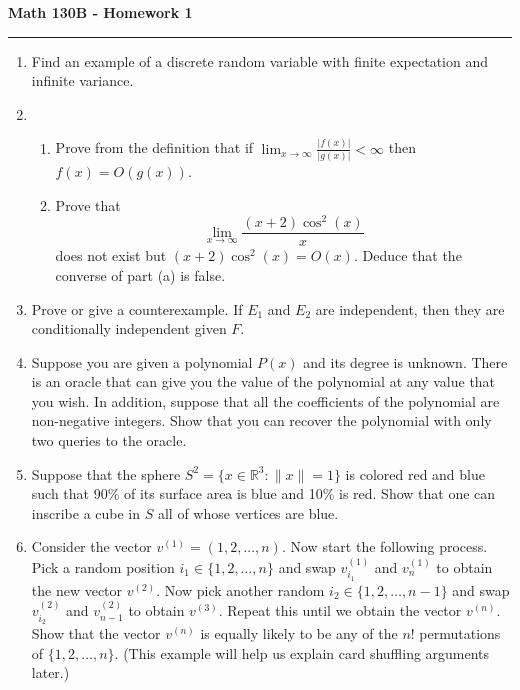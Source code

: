 \documentclass[11pt,letterpaper]{report}
\newcommand{\reals}{\mathbb{R}}
\begin{document}
\begin{center}
{\bf \Large Math 130B - Homework 1}
\vspace{0.2cm}
\hrule
\end{center}

\begin{enumerate}



	\item Find an example of a discrete random variable with finite expectation and infinite variance.

	\item \begin{enumerate}
		\item Prove from the definition that if $\lim_{x\to \infty}\frac{|f(x)|}{|g(x)|}<\infty$ then $f(x) = O(g(x))$.
		\item Prove that
		\[
		\lim_{x\to \infty} \frac{(x+2)\cos^2(x)}{x}
		\]
		does not exist but $(x+2)\cos^2(x) = O(x)$. Deduce that the converse of part (a) is false.
	\end{enumerate}

	\item Prove or give a counterexample. If $E_1$ and $E_2$ are independent, then they are conditionally independent given $F$.

	\item Suppose you are given a polynomial $P(x)$ and its degree is unknown. There is an oracle that can give you the value of the polynomial at any value that you wish. In addition, suppose that all the coefficients of the polynomial are non-negative integers. Show that you can recover the polynomial with only two queries to the oracle.

	\item Suppose that the sphere $S^2 = \{x\in \reals^3: \|x\| = 1\}$ is colored red and blue such that 90\% of its surface area is blue and 10\% is red. Show that one can inscribe a cube in $S$ all of whose vertices are blue.

	\item Consider the vector $v^{(1)} = (1, 2, \ldots, n)$. Now start the following process. Pick a random position $i_1\in \{1, 2, \ldots, n\}$ and swap $v^{(1)}_{i_1}$ and $v^{(1)}_n$ to obtain the new vector $v^{(2)}$. Now pick another random $i_2\in \{1, 2, \ldots, n-1\}$ and swap $v^{(2)}_{i_2}$ and $v^{(2)}_{n-1}$ to obtain $v^{(3)}$. Repeat this until we obtain the vector $v^{(n)}$.\\

	\noindent Show that the vector $v^{(n)}$ is equally likely to be any of the $n!$ permutations of $\{1, 2, \ldots, n\}$. (This example will help us explain card shuffling arguments later.)

\end{enumerate}
\end{document}
